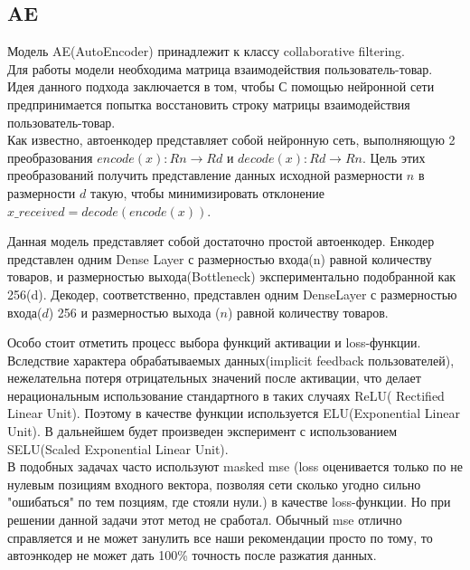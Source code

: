 \documentclass[14pt]{mmcs_article}
\begin{document}
\subsection{AE}
Модель AE(AutoEncoder) принадлежит к классу collaborative filtering. \\

Для работы модели необходима матрица взаимодействия пользователь-товар. Идея данного подхода заключается в том, чтобы С помощью нейронной сети предпринимается попытка восстановить строку матрицы взаимодействия пользователь-товар.\cite{AEA1} \\

Как известно, автоенкодер представляет собой нейронную сеть, выполняющую 2 преобразования  $encode(x) : Rn \rightarrow Rd$ и $decode(x) : Rd \rightarrow Rn$. Цель этих преобразований получить представление данных исходной размерности $n$ в размерности $d$ такую, чтобы минимизировать отклонение $x\_received =decode(encode(x))$.

Данная модель представляет собой достаточно простой автоенкодер. Енкодер представлен одним Dense Layer с размерностью входа(n) равной количеству товаров, и размерностью выхода(Bottleneck) экспериментально подобранной как 256(d). Декодер, соответственно, представлен одним DenseLayer с размерностью входа($d$) 256 и размерностью выхода ($n$) равной количеству товаров. 

Особо стоит отметить процесс выбора функций активации и loss-функции. Вследствие характера обрабатываемых данных(implicit feedback пользователей), нежелательна потеря отрицательных значений после активации, что делает нерациональным использование стандартного в таких случаях ReLU( Rectified Linear Unit). Поэтому в качестве функции используется ELU(Exponential Linear Unit). В дальнейшем будет произведен эксперимент с использованием SELU(Scaled Exponential Linear Unit).\\

В подобных задачах часто используют masked mse (loss оценивается только по не нулевым позициям входного вектора, позволяя сети сколько угодно сильно "ошибаться" по тем позциям, где стояли нули.) в качестве loss-функции.  Но при решении данной задачи этот метод не сработал. Обычный mse отлично справляется и не может занулить все наши рекомендации просто по тому, то автоэнкодер не может дать 100\% точность после разжатия данных.
\end{document}
